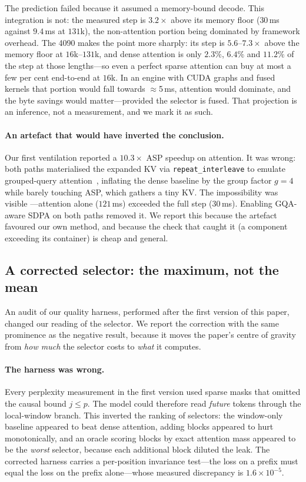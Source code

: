 \documentclass[sigconf,nonacm,11pt]{acmart}
\begin{document}
The prediction failed because it assumed a memory-bound decode. This integration
is not: the measured step is $3.2\times$ above its memory floor ($30$\,ms against
$9.4$\,ms at $131$k), the non-attention portion being dominated by framework
overhead. The 4090 makes the point more sharply: its step is $5.6$--$7.3\times$
above the memory floor at $16$k--$131$k, and dense attention is only $2.3\%$,
$6.4\%$ and $11.2\%$ of the step at those lengths---so even a perfect sparse
attention can buy at most a few per cent end-to-end at $16$k. In an engine with CUDA graphs and fused kernels that portion would fall
towards $\approx$5\,ms, attention would dominate, and the byte savings would
matter---provided the selector is fused. That projection is an inference, not a
measurement, and we mark it as such.

\paragraph{An artefact that would have inverted the conclusion.} Our first
ventilation reported a $10.3\times$ ASP speedup on attention. It was wrong: both
paths materialised the expanded KV via \texttt{repeat\_interleave} to emulate
grouped-query attention~\cite{ainslie2023gqa}, inflating the dense baseline by the group factor $g=4$
while barely touching ASP, which gathers a tiny KV. The impossibility was visible
---attention alone ($121$\,ms) exceeded the full step ($30$\,ms). Enabling
GQA-aware SDPA on both paths removed it. We report this because the artefact
favoured our own method, and because the check that caught it (a component
exceeding its container) is cheap and general.

\subsection{A corrected selector: the maximum, not the mean}
\label{sec:corrected}

An audit of our quality harness, performed after the first version of this paper,
changed our reading of the selector. We report the correction with the same
prominence as the negative result, because it moves the paper's centre of gravity
from \emph{how much} the selector costs to \emph{what} it computes.

\paragraph{The harness was wrong.} Every perplexity measurement in the first
version used sparse masks that omitted the causal bound $j\le p$. The model could
therefore read \emph{future} tokens through the local-window branch. This inverted
the ranking of selectors: the window-only baseline appeared to beat dense
attention, adding blocks appeared to hurt monotonically, and an oracle scoring
blocks by exact attention mass appeared to be the \emph{worst} selector, because
each additional block diluted the leak. The corrected harness carries a
per-position invariance test---the loss on a prefix must equal the loss on the
prefix alone---whose measured discrepancy is $1.6\times10^{-5}$.
\end{document}
